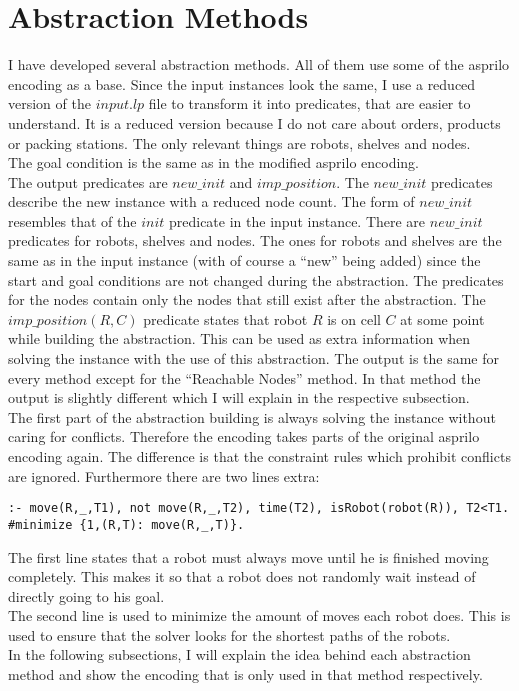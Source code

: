 \documentclass[runningheads]{llncs}
\begin{document}
\section{Abstraction Methods}
I have developed several abstraction methods. All of them use some of the asprilo encoding as a base. Since the input instances look the same, I use a reduced version of the $input.lp$ file to transform it into predicates, that are easier to understand.
It is a reduced version because I do not care about orders, products or packing stations. The only relevant things are robots, shelves and nodes. \\
The goal condition is the same as in the modified asprilo encoding. \\
The output predicates are $new\_init$ and $imp\_position$. The $new\_init$ predicates describe the new instance with a reduced node count. The form of $new\_init$ resembles that of the $init$ predicate in the input instance. There are $new\_init$ predicates for robots, shelves and nodes. The ones
for robots and shelves are the same as in the input instance (with of course a ``new'' being added) since the start and goal conditions are not changed during the abstraction. The predicates for the nodes contain only the nodes that still exist after the abstraction. The $imp\_position(R,C)$ predicate states that robot $R$ is on cell $C$ at some point while building the abstraction. This can be used as extra information when solving the instance with the use of this abstraction. The output is the same for every method except for the ``Reachable Nodes'' method. In that method the output is slightly different which I will explain in the respective subsection. \\
The first part of the abstraction building is always solving the instance without caring for conflicts. Therefore the encoding takes parts of the original asprilo encoding again. The difference is that the constraint rules which prohibit conflicts are ignored.
Furthermore there are two lines extra:
\begin{verbatim}
:- move(R,_,T1), not move(R,_,T2), time(T2), isRobot(robot(R)), T2<T1.
#minimize {1,(R,T): move(R,_,T)}.
\end{verbatim}
The first line states that a robot must always move until he is finished moving completely. This makes it so that a robot does not randomly wait instead of directly going to his goal. \\
The second line is used to minimize the amount of moves each robot does. This is used to ensure that the solver looks for the shortest paths of the robots. \\
In the following subsections, I will explain the idea behind each abstraction method and show the encoding that is only used in that method respectively. 
\end{document}

